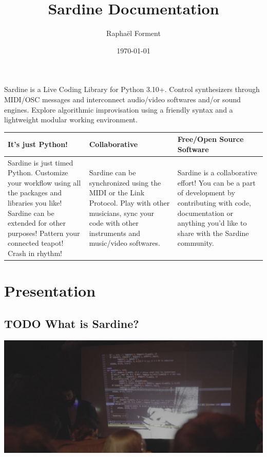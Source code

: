 \documentclass[11pt]{article}
\author{Raphaël Forment}
\date{\today}
\title{Sardine Documentation}
\begin{document}
\maketitle
\tableofcontents

Sardine is a Live Coding Library for Python 3.10+. Control synthesizers through MIDI/OSC messages and interconnect audio/video softwares and/or sound engines. Explore algorithmic improvisation using a friendly syntax and a lightweight modular working environment.

\begin{center}
\begin{tabular}{lll}
\textbf{It's just Python!} & \textbf{Collaborative} & \textbf{Free/Open Source Software}\\[0pt]
\hline
Sardine is just timed Python. Customize your workflow using all the packages and libraries you like! Sardine can be extended for other purposes! Pattern your connected teapot! Crash in rhythm! & Sardine can be synchronized using the MIDI or the Link Protocol. Play with other musicians, sync your code with other instruments and music/video softwares. & Sardine is a collaborative effort! You can be a part of development by contributing with code, documentation or anything you'd like to share with the Sardine community.\\[0pt]
\end{tabular}
\end{center}

\section{Presentation}
\label{sec:org2001e78}
\subsection{{\bfseries\sffamily TODO} What is Sardine?}
\label{sec:org70dd7be}
\begin{center}
\includegraphics[width=.9\linewidth]{what_is_sardine.png}
\end{center}
\end{document}
